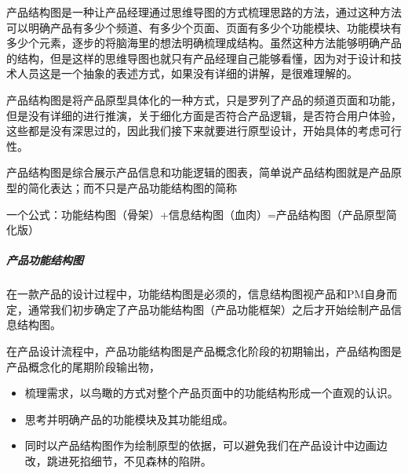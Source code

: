 \documentclass[letterpaper,11pt,english]{sphinxmanual}
\begin{document}
产品结构图是一种让产品经理通过思维导图的方式梳理思路的方法，通过这种方法可以明确产品有多少个频道、有多少个页面、页面有多少个功能模块、功能模块有多少个元素，逐步的将脑海里的想法明确梳理成结构。虽然这种方法能够明确产品的结构，但是这样的思维导图也就只有产品经理自己能够看懂，因为对于设计和技术人员这是一个抽象的表述方式，如果没有详细的讲解，是很难理解的。

产品结构图是将产品原型具体化的一种方式，只是罗列了产品的频道页面和功能，但是没有详细的进行推演，关于细化方面是否符合产品逻辑，是否符合用户体验，这些都是没有深思过的，因此我们接下来就要进行原型设计，开始具体的考虑可行性。%
\begin{footnote}[520]\sphinxAtStartFootnote
{}
%
\end{footnote}

产品结构图是综合展示产品信息和功能逻辑的图表，简单说产品结构图就是产品原型的简化表达；而不只是产品功能结构图的简称%
\begin{footnote}[521]\sphinxAtStartFootnote
{}
%
\end{footnote}

一个公式：功能结构图（骨架）+信息结构图（血肉）=产品结构图（产品原型简化版）%
\begin{footnote}[522]\sphinxAtStartFootnote
{}
%
\end{footnote}


\subparagraph{产品功能结构图}
\label{\detokenize{chapter_knowledge/flow_chart:id30}}
在一款产品的设计过程中，功能结构图是必须的，信息结构图视产品和PM自身而定，通常我们初步确定了产品功能结构图（产品功能框架）之后才开始绘制产品信息结构图。

在产品设计流程中，产品功能结构图是产品概念化阶段的初期输出，产品结构图是产品概念化的尾期阶段输出物，
\begin{itemize}
\item {} 
梳理需求，以鸟瞰的方式对整个产品页面中的功能结构形成一个直观的认识。

\item {} 
思考并明确产品的功能模块及其功能组成。%
\begin{footnote}[523]\sphinxAtStartFootnote
{}
%
\end{footnote}

\item {} 
同时以产品结构图作为绘制原型的依据，可以避免我们在产品设计中边画边改，跳进死掐细节，不见森林的陷阱。%
\begin{footnote}[524]\sphinxAtStartFootnote
{}
%
\end{footnote}

\end{itemize}
\end{document}
